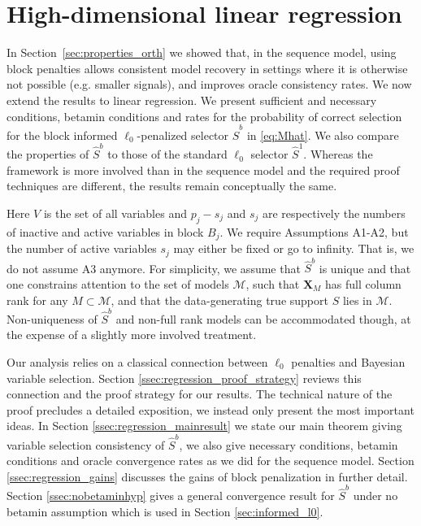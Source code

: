 \documentclass[aos]{imsart}
\theoremstyle{plain}
\newcommand{\bs}{\boldsymbol}
\begin{document}
\section{High-dimensional linear regression}
\label{sec:properties_legression}

In Section~\ref{sec:properties_orth} we showed that, in the sequence model, using block penalties allows consistent model recovery in settings where it is otherwise not possible (e.g. smaller signals), and improves oracle consistency rates. We now extend the results to linear regression. 
We present sufficient and necessary conditions, 
betamin conditions and rates for the probability of correct selection for the block informed $\ell_0$-penalized selector $\hat S^b$ in \eqref{eq:Mhat}. We also compare the properties of $\hat S^b$ to those of the standard $\ell_0$ selector $\hat S^1$. 
Whereas the framework is more involved than in the sequence model and the required proof techniques are different, the results remain conceptually the same. 

Here $V$ is the set of all variables and $p_j-s_j$ and $s_j$ are respectively the numbers of inactive and active variables in block $B_j$. We require Assumptions A1-A2, but the number of active variables $s_j$ may either be fixed or go to infinity. 
That is, we do not assume A3 anymore. For simplicity, we assume that $\hat{S}^b$ is unique and that one constrains attention to the set of models $\mathcal{M}$,
such that
$\bs X_M$ has full column rank for any $M \subset \mathcal{M}$, and that the data-generating true support $S$ lies in $\mathcal{M}$. Non-uniqueness of $\hat{S}^b$ and non-full rank models can be accommodated though, at the expense of a slightly more involved treatment.

Our analysis relies on a classical connection
between $\ell_0$ penalties and Bayesian variable selection. 
Section \ref{ssec:regression_proof_strategy} reviews this connection and the proof strategy for our results.
The technical nature of the proof precludes a detailed exposition, we instead only present the most important ideas.
In Section \ref{ssec:regression_mainresult} we state our main theorem
giving variable selection consistency of $\hat{S}^{b}$, we also give necessary conditions, betamin conditions and oracle convergence rates as we did for the sequence model. Section \ref{ssec:regression_gains} discusses the gains of block penalization in further detail. Section \ref{ssec:nobetaminhyp} gives a general convergence result for $\hat{S}^{b}$ under no betamin assumption which is used in Section \ref{sec:informed_l0}.
\end{document}
